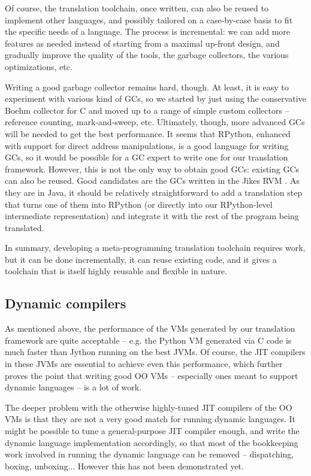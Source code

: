 \documentclass{llncs}
\begin{document}
Of course, the translation toolchain, once written, can also be reused
to implement other languages, and possibly tailored on a case-by-case
basis to fit the specific needs of a language.  The process is
incremental: we can add more features as needed instead of starting from
a maximal up-front design, and gradually improve the quality of the
tools, the garbage collectors, the various optimizations, etc.

Writing a good garbage collector remains hard, though.  At least, it is
easy to experiment with various kind of GCs, so we started by just using
the conservative Boehm \cite{Boehm} collector for C and moved up to a
range of simple custom collectors -- reference counting, mark-and-sweep,
etc.  Ultimately, though, more advanced GCs will be needed to get the
best performance.  It seems that RPython, enhanced with support for
direct address manipulations, is a good language for writing GCs, so it
would be possible for a GC expert to write one for our translation
framework.  However, this is not the only way to obtain good GCs:
existing GCs can also be reused.  Good candidates are the GCs written in
the Jikes RVM \cite{JikesGC}.  As they are in Java, it should be
relatively straightforward to add a translation step that turns one of
them into RPython (or directly into our RPython-level intermediate
representation) and integrate it with the rest of the program being
translated.

In summary, developing a meta-programming translation toolchain requires
work, but it can be done incrementally, it can reuse existing code, and
it gives a toolchain that is itself highly reusable and flexible in
nature.

\subsection{Dynamic compilers}
\label{subsect:dynamic_compilers}

As mentioned above, the performance of the VMs generated by our
translation framework are quite acceptable -- e.g. the Python VM
generated via C code is much faster than Jython running on the best
JVMs.  Of course, the JIT compilers in these JVMs are essential to
achieve even this performance, which further proves the point that
writing good OO VMs -- especially ones meant to support dynamic
languages -- is a lot of work.

The deeper problem with the otherwise highly-tuned JIT compilers of the
OO VMs is that they are not a very good match for running dynamic
languages.  It might be possible to tune a general-purpose JIT compiler
enough, and write the dynamic language implementation accordingly, so
that most of the bookkeeping work involved in running the dynamic
language can be removed -- dispatching, boxing, unboxing...  However
this has not been demonstrated yet.
\end{document}
